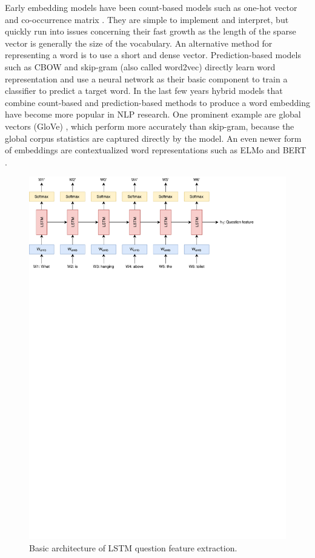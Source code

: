 \documentclass{article}
\begin{document}
Early embedding models have been count-based models such as one-hot vector %
and co-occurrence matrix \citep{miller1991contextual}. They are simple to implement and interpret, but quickly run into issues concerning their fast growth as the length of the sparse vector is generally the size of the vocabulary. An alternative method for representing a word is to use a short and dense vector. Prediction-based models such as CBOW and skip-gram (also called word2vec) \citep{mikolov2013efficient} directly learn word representation and use a neural network as their basic component to train a classifier to predict a target word. In the last few years hybrid models that combine count-based and prediction-based methods to produce a word embedding have become more popular in NLP research. One prominent example are global vectors (GloVe) \citep{pennington2014glove}, which perform more accurately than skip-gram, because the global corpus statistics are captured directly by the model. An even newer form of embeddings are contextualized word representations such as ELMo \citep{peters2018elmo} and BERT \citep{devlin-etal-2019-bert}.

\begin{figure}[H]
	\centering
	\includegraphics[width=\linewidth]{lstm.pdf}
	\caption{Basic architecture of LSTM question feature extraction.}
	\label{fig:lstm}
\end{figure}
\end{document}
